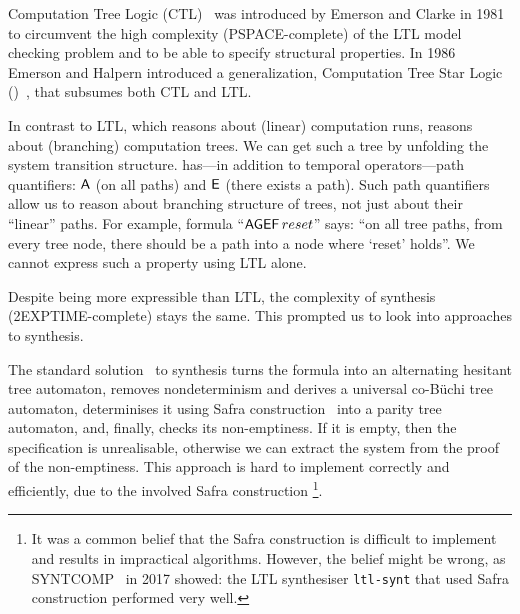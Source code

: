 
Computation Tree Logic (CTL)~\cite{ctl-origin}
was introduced by Emerson and Clarke in 1981
to circumvent the high complexity (PSPACE-complete) of the LTL model checking problem
and to be able to specify structural properties.
In 1986 Emerson and Halpern introduced a generalization,
Computation Tree Star Logic (\CTLstar)~\cite{ctlstar-origin},
that subsumes both CTL and LTL.


In contrast to LTL, which reasons about (linear) computation runs,
\CTLstar reasons about (branching) computation trees.
We can get such a tree by unfolding the system transition structure.
\CTLstar has---in addition to temporal operators---path quantifiers:
${\operatorname{\mathsf{A}}}$ (on all paths) and ${\operatorname{\mathsf{E}}}$ (there exists a path).
Such path quantifiers allow us to reason about branching structure of trees,
not just about their ``linear'' paths.
For example, \CTLstar formula ``$\operatorname{\mathsf{AGEF}} reset$'' says:
``on all tree paths, from every tree node,
  there should be a path into a node where `reset' holds''.
We cannot express such a property using LTL alone.


Despite \CTLstar being more expressible than LTL,
the complexity of \CTLstar synthesis (2EXPTIME-complete)
stays the same.
This prompted us to look into approaches to \CTLstar synthesis.


The standard solution~\cite{informatio} to \CTLstar synthesis
turns the \CTLstar formula into an alternating hesitant tree automaton,
removes nondeterminism and derives a universal co-B\"uchi tree automaton,
determinises it using Safra construction~\cite{Safra} into a parity tree automaton,
and, finally, checks its non-emptiness.
If it is empty, then the specification is unrealisable,
otherwise we can extract the system from the proof of the non-emptiness.
This approach is hard to implement correctly and efficiently,
due to the involved Safra construction%
\footnote{It was a common belief that the Safra construction
  is difficult to implement and results in impractical algorithms.
  However, the belief might be wrong,
  as SYNTCOMP~\cite{syntcomp} in 2017 showed:
  the LTL synthesiser {\tt ltl-synt} that used Safra construction performed very well.}.


